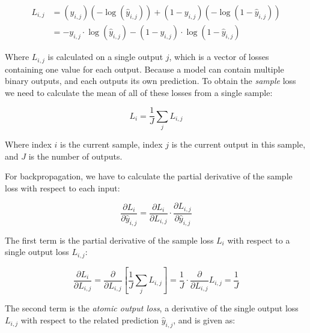 \documentclass[a4paper]{article}
\begin{document}
\begin{align*}
    L_{i,j} &= (y_{i,j})(-\log(\hat{y}_{i,j})) + (1-y_{i,j})(-\log(1-\hat{y}_{i,j})) \\
    &= -y_{i,j} \cdot \log(\hat{y}_{i,j}) - (1-y_{i,j}) \cdot \log(1-\hat{y}_{i,j})
\end{align*}

Where $L_{i,j}$ is calculated on a single output $j$, which is a vector of losses containing one value for each output. Because a model can contain multiple binary outputs, and each outputs its own prediction. To obtain the \emph{sample} loss we need to calculate the mean of all of these losses from a single sample:

\begin{equation*}
    L_i = \frac{1}{J}\sum_{j}L_{i,j}
\end{equation*}

Where index $i$ is the current sample, index $j$ is the current output in this sample, and $J$ is the number of outputs.

For backpropagation, we have to calculate the partial derivative of the sample loss with respect to
each input:

\begin{equation*}
    \frac{\partial L_i}{\partial\hat{y}_{i,j}} = \frac{\partial L_i}{\partial L_{i,j}} \cdot \frac{\partial L_{i,j}}{\partial\hat{y}_{i,j}}
\end{equation*}

The first term is the partial derivative of the sample loss $L_i$ with respect to a single output loss $L_{i,j}$:

\begin{equation*}
    \frac{\partial L_i}{\partial L_{i,j}} = \frac{\partial}{\partial L_{i,j}} [ \frac{1}{J}\sum_j L_{i,j} ] = \frac{1}{J} \cdot \frac{\partial}{\partial L_{i,j}} L_{i,j} = \frac{1}{J}
\end{equation*}

The second term is the \emph{atomic output loss}, a derivative of the single output loss $L_{i,j}$ with respect to the related prediction $\hat{y}_{i,j}$, and is given as:
\end{document}
